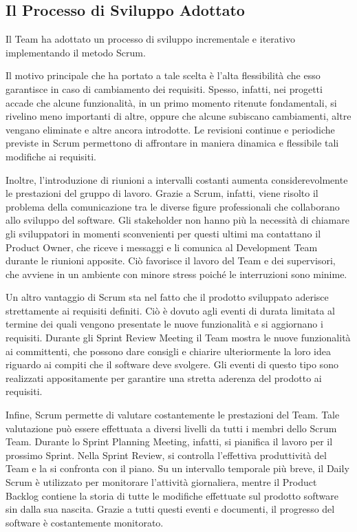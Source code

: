 			

		\subsection*{Il Processo di Sviluppo Adottato}
			Il Team ha adottato un processo di sviluppo incrementale e iterativo implementando il metodo Scrum.

			Il motivo principale che ha portato a tale scelta è l'alta flessibilità che esso garantisce in caso di cambiamento dei requisiti.
			Spesso, infatti, nei progetti accade che alcune funzionalità, in un primo momento ritenute fondamentali, si rivelino meno importanti di altre, oppure che alcune subiscano cambiamenti, altre vengano eliminate e altre ancora introdotte.
			Le revisioni continue e periodiche previste in Scrum permettono di affrontare in maniera dinamica e flessibile tali modifiche ai requisiti.
	
			Inoltre, l'introduzione di riunioni a intervalli costanti aumenta considerevolmente le prestazioni del gruppo di lavoro.
			Grazie a Scrum, infatti, viene risolto il problema della comunicazione tra le diverse figure professionali che collaborano allo sviluppo del software.  
			Gli stakeholder non hanno più la necessità di chiamare gli sviluppatori in momenti sconvenienti per questi ultimi ma contattano il Product Owner, che riceve i messaggi e li comunica al Development Team durante le riunioni apposite.
			Ciò favorisce il lavoro del Team e dei supervisori, che avviene in un ambiente con minore stress poiché le interruzioni sono minime.

			Un altro vantaggio di Scrum sta nel fatto che il prodotto sviluppato aderisce strettamente ai requisiti definiti.
			Ciò è dovuto agli eventi di durata limitata al termine dei quali vengono presentate le nuove funzionalità e si aggiornano i requisiti.
			Durante gli Sprint Review Meeting il Team mostra le nuove funzionalità ai committenti, che possono dare consigli e chiarire ulteriormente la loro idea riguardo ai compiti che il software deve svolgere.
			Gli eventi di questo tipo sono realizzati appositamente per garantire una stretta aderenza del prodotto ai requisiti.

			Infine, Scrum permette di valutare costantemente le prestazioni del Team.
			Tale valutazione può essere effettuata a diversi livelli da tutti i membri dello Scrum Team.
			Durante lo Sprint Planning Meeting, infatti, si pianifica il lavoro per il prossimo Sprint.
			Nella Sprint Review, si controlla l'effettiva produttività del Team e la si confronta con il piano.
			Su un intervallo temporale più breve, il Daily Scrum è utilizzato per monitorare l'attività giornaliera, mentre il Product Backlog contiene la storia di tutte le modifiche effettuate sul prodotto software sin dalla sua nascita. 
			Grazie a tutti questi eventi e documenti, il progresso del software è costantemente monitorato. 
			
